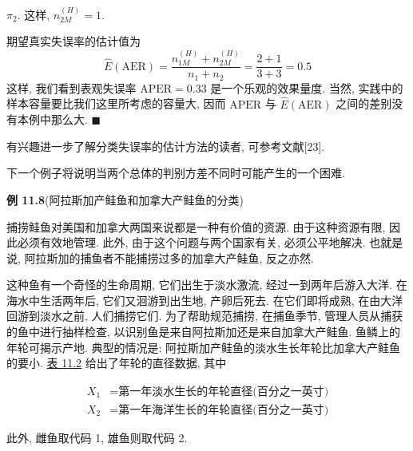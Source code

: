 
$\pi_2$. 这样, $n_{2M}^{(H)}=1$.

期望真实失误率的估计值为
\[
\hat{E}(\mathrm{AER})=\frac{n_{1M}^{(H)}+n_{2M}^{(H)}}{n_1+n_2}=\frac{2+1}{3+3}=0.5
\]
这样, 我们看到表观失误率 $\mathrm{APER}=0.33$ 是一个乐观的效果量度. 当然, 实践中的样本容量要比我们这里所考虑的容量大, 因而 $\mathrm{APER}$ 与 $\hat{E}(\mathrm{AER})$ 之间的差别没有本例中那么大. $\blacksquare$

有兴趣进一步了解分类失误率的估计方法的读者, 可参考文献[23].

下一个例子将说明当两个总体的判别方差不同时可能产生的一个困难.

\noindent\textbf{例 11.8}\quad (阿拉斯加产鲑鱼和加拿大产鲑鱼的分类)

捕捞鲑鱼对美国和加拿大两国来说都是一种有价值的资源. 由于这种资源有限, 因此必须有效地管理. 此外, 由于这个问题与两个国家有关, 必须公平地解决. 也就是说, 阿拉斯加的捕鱼者不能捕捞过多的加拿大产鲑鱼, 反之亦然.

这种鱼有一个奇怪的生命周期, 它们出生于淡水激流, 经过一到两年后游入大洋. 在海水中生活两年后, 它们又洄游到出生地, 产卵后死去. 在它们即将成熟, 在由大洋回游到淡水之前, 人们捕捞它们. 为了帮助规范捕捞, 在捕鱼季节, 管理人员从捕获的鱼中进行抽样检查, 以识别鱼是来自阿拉斯加还是来自加拿大产鲑鱼. 鱼鳞上的年轮可揭示产地. 典型的情况是: 阿拉斯加产鲑鱼的淡水生长年轮比加拿大产鲑鱼的要小. \hyperref[tab:11.2]{表 11.2} 给出了年轮的直径数据, 其中

\begin{align*}
X_1&=\text{第一年淡水生长的年轮直径(百分之一英寸)}\\
X_2&=\text{第一年海洋生长的年轮直径(百分之一英寸)}
\end{align*}

此外, 雌鱼取代码 1, 雄鱼则取代码 2.

